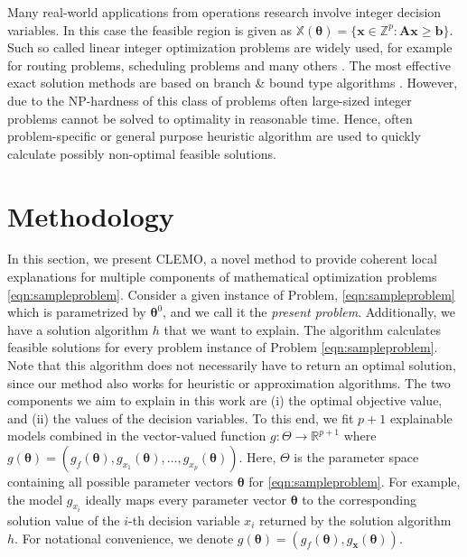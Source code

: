 \documentclass{article}
\theoremstyle{plain}
\theoremstyle{definition}
\theoremstyle{remark}
\begin{document}
Many real-world applications from operations research involve integer decision variables. In this case the feasible region is given as $\mathbb{X}(\bm{\theta}) = \{\bm{x}\in \mathbb Z^p : \bm{A} \bm{x} \ge  \bm{b}\}$. Such so called linear integer optimization problems are widely used, for example for routing problems, scheduling problems and many others \cite{petropoulos2024operational}. The most effective exact solution methods are based on branch \& bound type algorithms \cite{wolsey2020integer}. However, due to the NP-hardness of this class of problems often large-sized integer problems cannot be solved to optimality in reasonable time. Hence, often problem-specific or general purpose heuristic algorithm are used to quickly calculate possibly non-optimal feasible solutions.


\section{Methodology}\label{sec:Methodology}
In this section, we present CLEMO, a novel method to provide coherent local explanations for multiple components of mathematical optimization problems \eqref{eqn:sampleproblem}. Consider a given instance of Problem, \eqref{eqn:sampleproblem} which is parametrized by $\bm{\theta}^0$, and we call it the \textit{present problem}.
Additionally, we have a solution algorithm $h$ that we want to explain. The algorithm calculates feasible solutions for every problem instance of Problem \eqref{eqn:sampleproblem}. Note that this algorithm does not necessarily have to return an optimal solution, since our method also works for heuristic or approximation algorithms. The two components we aim to explain in this work are (i) the optimal objective value, and (ii) the values of the decision variables. To this end, we fit $p+1$ explainable models combined in the vector-valued function $g: \Theta \to \mathbb{R}^{p+1}$ where $g(\bm{\theta}) = (g_f(\bm{\theta}), g_{x_1}(\bm{\theta}), \dots, g_{x_p}(\bm{\theta}))$. Here, $\Theta$ is the parameter space containing all possible parameter vectors $\bm{\theta}$ for \eqref{eqn:sampleproblem}. For example, the model $g_{x_i}$ ideally maps every parameter vector $\bm{\theta}$ to the corresponding solution value of the $i$-th decision variable $x_i$ returned by the solution algorithm $h$. For notational convenience, we denote $g(\bm{\theta}) = (g_f(\bm{\theta}), g_{\bm{x}}(\bm{\theta}))$.
\end{document}
